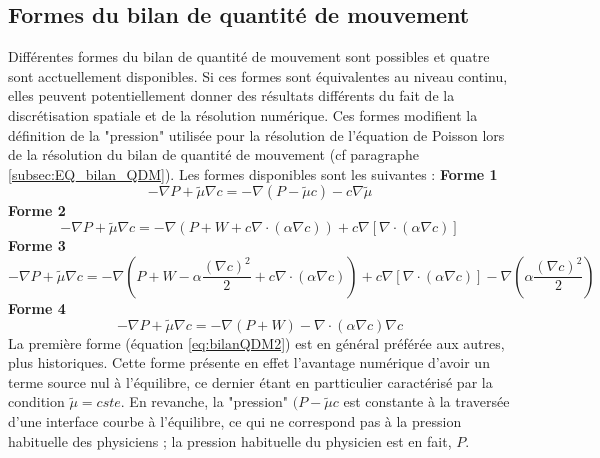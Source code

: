 \subsection{Formes du bilan de quantit\'e de mouvement}
Diff\'erentes formes du bilan de quantit\'e de mouvement sont possibles et quatre sont acctuellement disponibles. Si ces formes sont
\'equivalentes au niveau continu, elles peuvent potentiellement donner des r\'esultats diff\'erents du fait de la discr\'etisation spatiale et de
la r\'esolution num\'erique. Ces formes modifient la d\'efinition de la "pression" utilis\'ee pour la r\'esolution de l'\'equation de Poisson
lors de la r\'esolution du bilan de quantit\'e de mouvement (cf paragraphe \ref{subsec:EQ_bilan_QDM}). Les formes disponibles sont les suivantes :
\medskip\newline
\textbf{Forme 1}\newline
\begin{equation}
-\nabla P + \tilde{\mu}\nabla c = -\nabla\left(P - \tilde{\mu}c\right) - c\nabla\tilde{\mu}\label{eq:bilanQDM2}
\end{equation}
\textbf{Forme 2}\newline
\begin{equation}
-\nabla P + \tilde{\mu}\nabla c = -\nabla\left(P+W+c\nabla\cdot\left(\alpha\nabla c\right)\right)+c\nabla\left[\nabla\cdot\left(\alpha\nabla
c\right)\right]
\end{equation}
\textbf{Forme 3}\newline
\begin{equation}
-\nabla P + \tilde{\mu}\nabla c = -\nabla\left(P+W-\alpha\frac{\left(\nabla c\right)^2}{2}+c\nabla\cdot\left(\alpha\nabla
c\right)\right)+c\nabla\left[\nabla\cdot\left(\alpha\nabla c\right)\right]-\nabla\left(\alpha\frac{\left(\nabla c\right)^2}{2}\right)
\end{equation}
\textbf{Forme 4}\newline
\begin{equation}
-\nabla P + \tilde{\mu}\nabla c = -\nabla\left(P+W\right)-\nabla\cdot\left(\alpha\nabla c\right)\nabla c
\end{equation}
La premi\`ere forme (\'equation \ref{eq:bilanQDM2}) est en g\'en\'eral pr\'ef\'er\'ee aux autres, plus historiques. Cette forme pr\'esente en
effet l'avantage num\'erique d'avoir un terme source nul \`a l'\'equilibre, ce dernier \'etant en partticulier caract\'eris\'e par la condition
$\tilde{\mu}=cste$. En revanche, la "pression" $(P-\tilde{\mu}c$ est constante \`a la travers\'ee d'une interface courbe \`a l'\'equilibre, ce
qui ne correspond pas \`a la pression habituelle des physiciens ; la pression habituelle du physicien est en fait, $P$.

